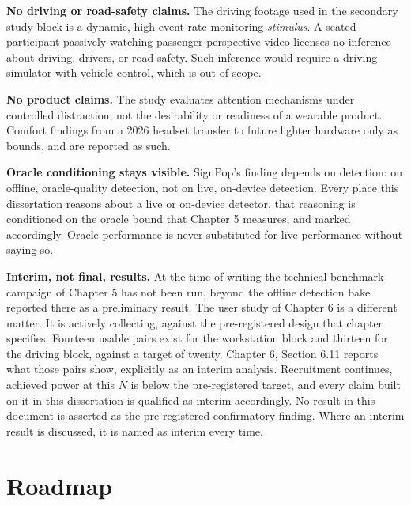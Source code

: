 \textbf{No driving or road-safety claims.} The driving footage used in the secondary study block is a
dynamic, high-event-rate monitoring \textit{stimulus}. A seated participant passively watching
passenger-perspective video licenses no inference about driving, drivers, or road safety. Such
inference would require a driving simulator with vehicle control, which is out of scope.

\textbf{No product claims.} The study evaluates attention mechanisms under controlled distraction, not the
desirability or readiness of a wearable product. Comfort findings from a 2026 headset transfer to
future lighter hardware only as bounds, and are reported as such.

\textbf{Oracle conditioning stays visible.} SignPop's finding depends on detection: on offline,
oracle-quality detection, not on live, on-device detection. Every place this dissertation reasons
about a live or on-device detector, that reasoning is conditioned on the oracle bound that Chapter 5
measures, and marked accordingly. Oracle performance is never substituted for live performance
without saying so.

\textbf{Interim, not final, results.} At the time of writing the technical benchmark campaign of
Chapter 5 has not been run, beyond the offline detection bake reported there as a preliminary result.
The user study of Chapter 6 is a different matter. It is actively collecting, against the
pre-registered design that chapter specifies. Fourteen usable pairs exist for the workstation block
and thirteen for the driving block, against a target of twenty. Chapter 6, Section 6.11 reports what
those pairs show, explicitly as an interim analysis. Recruitment continues, achieved power at this $N$ is
below the pre-registered target, and every claim built on it in this dissertation is qualified as
interim accordingly. No result in this document is asserted as the pre-registered confirmatory
finding. Where an interim result is discussed, it is named as interim every time.

\section{Roadmap}

